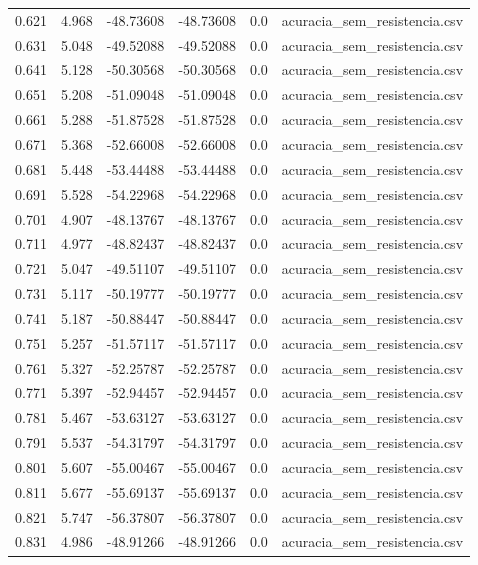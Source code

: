\begin{table}
\begin{tabular}{llllll}
0.621 & 4.968 & -48.73608 & -48.73608 & 0.0 & acuracia\_sem\_resistencia.csv \\
0.631 & 5.048 & -49.52088 & -49.52088 & 0.0 & acuracia\_sem\_resistencia.csv \\
0.641 & 5.128 & -50.30568 & -50.30568 & 0.0 & acuracia\_sem\_resistencia.csv \\
0.651 & 5.208 & -51.09048 & -51.09048 & 0.0 & acuracia\_sem\_resistencia.csv \\
0.661 & 5.288 & -51.87528 & -51.87528 & 0.0 & acuracia\_sem\_resistencia.csv \\
0.671 & 5.368 & -52.66008 & -52.66008 & 0.0 & acuracia\_sem\_resistencia.csv \\
0.681 & 5.448 & -53.44488 & -53.44488 & 0.0 & acuracia\_sem\_resistencia.csv \\
0.691 & 5.528 & -54.22968 & -54.22968 & 0.0 & acuracia\_sem\_resistencia.csv \\
0.701 & 4.907 & -48.13767 & -48.13767 & 0.0 & acuracia\_sem\_resistencia.csv \\
0.711 & 4.977 & -48.82437 & -48.82437 & 0.0 & acuracia\_sem\_resistencia.csv \\
0.721 & 5.047 & -49.51107 & -49.51107 & 0.0 & acuracia\_sem\_resistencia.csv \\
0.731 & 5.117 & -50.19777 & -50.19777 & 0.0 & acuracia\_sem\_resistencia.csv \\
0.741 & 5.187 & -50.88447 & -50.88447 & 0.0 & acuracia\_sem\_resistencia.csv \\
0.751 & 5.257 & -51.57117 & -51.57117 & 0.0 & acuracia\_sem\_resistencia.csv \\
0.761 & 5.327 & -52.25787 & -52.25787 & 0.0 & acuracia\_sem\_resistencia.csv \\
0.771 & 5.397 & -52.94457 & -52.94457 & 0.0 & acuracia\_sem\_resistencia.csv \\
0.781 & 5.467 & -53.63127 & -53.63127 & 0.0 & acuracia\_sem\_resistencia.csv \\
0.791 & 5.537 & -54.31797 & -54.31797 & 0.0 & acuracia\_sem\_resistencia.csv \\
0.801 & 5.607 & -55.00467 & -55.00467 & 0.0 & acuracia\_sem\_resistencia.csv \\
0.811 & 5.677 & -55.69137 & -55.69137 & 0.0 & acuracia\_sem\_resistencia.csv \\
0.821 & 5.747 & -56.37807 & -56.37807 & 0.0 & acuracia\_sem\_resistencia.csv \\
0.831 & 4.986 & -48.91266 & -48.91266 & 0.0 & acuracia\_sem\_resistencia.csv \\

\end{tabular}
\end{table}
